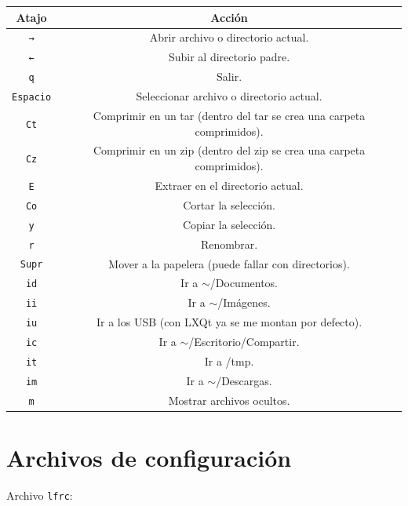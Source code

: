 \documentclass{article}
\begin{document}
    \begin{table}[h]
    	   \begin{tabular}{cc}
    	   	   \midrule
		   Atajo	&	Acción	\\
		   \midrule

		   \texttt{→}	&	Abrir archivo o directorio actual.	\\
           \texttt{←}   &   Subir al directorio padre.  \\
           \texttt{q}    &   Salir. \\
		   \texttt{Espacio}	&	Seleccionar archivo o directorio actual.	\\
		   \texttt{Ct}	&	Comprimir en un tar (dentro del tar se crea una carpeta comprimidos).	\\
		   \texttt{Cz}	&	Comprimir en un zip (dentro del zip se crea una carpeta comprimidos).	\\
           \texttt{E}	&	Extraer en el directorio actual.	\\
		   \texttt{Co}	&	Cortar la selección.	\\
		   \texttt{y}	&	Copiar la selección.	\\
		   \texttt{r}	&	Renombrar.	\\
		   \texttt{Supr}	&	Mover a la papelera (puede fallar con directorios).	\\
		   \texttt{id}	&	Ir a $\sim$/Documentos.	\\
           \texttt{ii}	&	Ir a $\sim$/Imágenes.	\\
           \texttt{iu}	&	Ir a los USB (con LXQt ya se me montan por defecto).	\\
           \texttt{ic}	&	Ir a $\sim$/Escritorio/Compartir.	\\
           \texttt{it}	&	Ir a /tmp.	\\
           \texttt{im}	&	Ir a $\sim$/Descargas.	\\
           \texttt{m}   &   Mostrar archivos ocultos.	\\
		   \midrule
    	   \end{tabular}
    \end{table}

    \section{Archivos de configuración}
    Archivo \texttt{lfrc}:

    \inputminted[breaklines, breakanywhere, breaksymbolleft="", breaksymbolright="", breakanywheresymbolpre="", breakanywheresymbolpost=""]
    {vim}{inc/lfrc}
\end{document}
